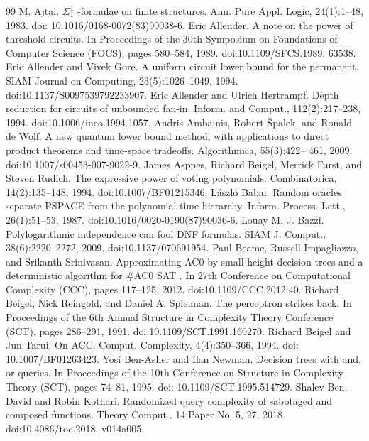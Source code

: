 \begin{thebibliography}{99}
 M. Ajtai. $\Sigma^1_1$ -formulae on finite structures. Ann. Pure Appl. Logic, 24(1):1–48, 1983. doi: 10.1016/0168-0072(83)90038-6.
 Eric Allender. A note on the power of threshold circuits. In Proceedings of the 30th Symposium on Foundations of Computer Science (FOCS), pages 580–584, 1989. doi:10.1109/SFCS.1989. 63538.
 Eric Allender and Vivek Gore. A uniform circuit lower bound for the permanent. SIAM Journal on Computing, 23(5):1026–1049, 1994. doi:10.1137/S0097539792233907.
 Eric Allender and Ulrich Hertrampf. Depth reduction for circuits of unbounded fan-in. Inform. and Comput., 112(2):217–238, 1994. doi:10.1006/inco.1994.1057.
 Andris Ambainis, Robert Špalek, and Ronald de Wolf. A new quantum lower bound method, with applications to direct product theorems and time-space tradeoffs. Algorithmica, 55(3):422– 461, 2009. doi:10.1007/s00453-007-9022-9.
 James Aspnes, Richard Beigel, Merrick Furst, and Steven Rudich. The expressive power of voting polynomials. Combinatorica, 14(2):135–148, 1994. doi:10.1007/BF01215346.
 László Babai. Random oracles separate PSPACE from the polynomial-time hierarchy. Inform. Process. Lett., 26(1):51–53, 1987. doi:10.1016/0020-0190(87)90036-6.
 Louay M. J. Bazzi. Polylogarithmic independence can fool DNF formulas. SIAM J. Comput., 38(6):2220–2272, 2009. doi:10.1137/070691954.
 Paul Beame, Russell Impagliazzo, and Srikanth Srinivasan. Approximating AC0 by small height decision trees and a deterministic algorithm for \#AC0 SAT . In 27th Conference on Computational Complexity (CCC), pages 117–125, 2012. doi:10.1109/CCC.2012.40.
 Richard Beigel, Nick Reingold, and Daniel A. Spielman. The perceptron strikes back. In Proceedings of the 6th Annual Structure in Complexity Theory Conference (SCT), pages 286–291, 1991. doi:10.1109/SCT.1991.160270.
 Richard Beigel and Jun Tarui. On ACC. Comput. Complexity, 4(4):350–366, 1994. doi: 10.1007/BF01263423.
 Yosi Ben-Asher and Ilan Newman. Decision trees with and, or queries. In Proceedings of the 10th Conference on Structure in Complexity Theory (SCT), pages 74–81, 1995. doi: 10.1109/SCT.1995.514729.
 Shalev Ben-David and Robin Kothari. Randomized query complexity of sabotaged and composed functions. Theory Comput., 14:Paper No. 5, 27, 2018. doi:10.4086/toc.2018. v014a005.

\end{thebibliography}
